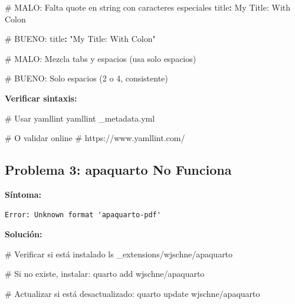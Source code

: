 \documentclass[
  doc,
  floatsintext,
  longtable,
  a4paper,
  nolmodern,
  notxfonts,
  notimes,
  12pt,
  colorlinks=true,linkcolor=blue,citecolor=blue,urlcolor=blue]{apa7}
\newenvironment{Shaded}{\begin{snugshade}}{\end{snugshade}}
\newcommand{\AttributeTok}[1]{\textcolor[rgb]{0.40,0.45,0.13}{#1}}
\newcommand{\CommentTok}[1]{\textcolor[rgb]{0.37,0.37,0.37}{#1}}
\newcommand{\ExtensionTok}[1]{\textcolor[rgb]{0.00,0.23,0.31}{#1}}
\newcommand{\FunctionTok}[1]{\textcolor[rgb]{0.28,0.35,0.67}{#1}}
\newcommand{\KeywordTok}[1]{\textcolor[rgb]{0.00,0.23,0.31}{\textbf{#1}}}
\newcommand{\NormalTok}[1]{\textcolor[rgb]{0.00,0.23,0.31}{#1}}
\newcommand{\StringTok}[1]{\textcolor[rgb]{0.13,0.47,0.30}{#1}}
\begin{document}
\begin{Shaded}
\begin{Highlighting}[]
\CommentTok{\#  MALO: Falta quote en string con caracteres especiales}
\FunctionTok{title}\KeywordTok{:}\AttributeTok{ My Title: With Colon}

\CommentTok{\# BUENO:}
\FunctionTok{title}\KeywordTok{:}\AttributeTok{ }\StringTok{"My Title: With Colon"}
\end{Highlighting}
\end{Shaded}

\begin{Shaded}
\begin{Highlighting}[]
\CommentTok{\#  MALO: Mezcla tabs y espacios (usa solo espacios)}

\CommentTok{\# BUENO: Solo espacios (2 o 4, consistente)}
\end{Highlighting}
\end{Shaded}

\textbf{Verificar sintaxis:}

\begin{Shaded}
\begin{Highlighting}[]
\CommentTok{\# Usar yamllint}
\ExtensionTok{yamllint}\NormalTok{ \_metadata.yml}

\CommentTok{\# O validar online}
\CommentTok{\# https://www.yamllint.com/}
\end{Highlighting}
\end{Shaded}

\subsection{Problema 3: apaquarto No
Funciona}\label{problema-3-apaquarto-no-funciona}

\textbf{Síntoma:}

\begin{verbatim}
Error: Unknown format 'apaquarto-pdf'
\end{verbatim}

\textbf{Solución:}

\begin{Shaded}
\begin{Highlighting}[]
\CommentTok{\# Verificar si está instalado}
\FunctionTok{ls}\NormalTok{ \_extensions/wjschne/apaquarto}

\CommentTok{\# Si no existe, instalar:}
\ExtensionTok{quarto}\NormalTok{ add wjschne/apaquarto}

\CommentTok{\# Actualizar si está desactualizado:}
\ExtensionTok{quarto}\NormalTok{ update wjschne/apaquarto}
\end{Highlighting}
\end{Shaded}
\end{document}
